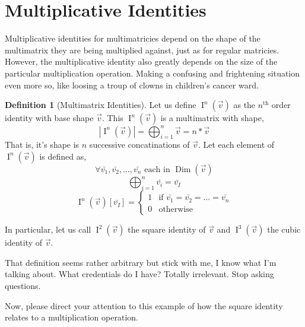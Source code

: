 \documentclass[12pt]{book}
\theoremstyle{plain}
\theoremstyle{definition}
\newtheorem{definition}{Definition}[chapter]
\theoremstyle{ppart}
\theoremstyle{case}
\theoremstyle{solution}
\DeclareMathOperator{\Dim}{Dim}
\DeclareMathOperator{\Ident}{I}
\newcommand{\shape}[1]{\left|#1\right|}
\begin{document}
\section{Multiplicative Identities}

Multiplicative identities for multimatricies depend on the shape of the
multimatrix they are being multiplied against, just as for regular matricies.
However, the multiplicative identity also greatly depends on the size of
the particular multiplication operation. Making a confusing and frightening
situation even more so, like loosing a troup of clowns in children's cancer ward.

\begin{definition}[Multimatrix Identities]
\label{mm_mult_ident}
Let us define $\Ident^n(\vec{v})$ as the $n^{\text{th}}$ order identity with base shape
$\vec{v}$. This $\Ident^n(\vec{v})$ is a multimatrix with shape,
\[ \shape{\Ident^n(\vec{v})} = \bigoplus_{i = 1}^n \vec{v}  = n * \vec{v} \]
That is, it's shape is $n$ successive concatinations of $\vec{v}$.
Let each element of $\Ident^n(\vec{v})$ is defined as,
\[ \forall \bar{v_1}, \bar{v_2}, \ldots, \bar{v_n} \text{ each in } \Dim(\vec{v}) \]
\[ \bigoplus_{i = 1}^n \bar{v_i} = \bar{v_I} \]
\[
 \Ident^n(\vec{v})[\bar{v_I}]
 = \left\{
  \begin{array}{ll}
    1 & \mbox{if } \bar{v_1} = \bar{v_2} = \ldots = \bar{v_n} \\
    0 & \mbox{otherwise}
  \end{array}
 \right.
\]

In particular, let us call $\Ident^2(\vec{v})$ the square identity of $\vec{v}$ and
$\Ident^3(\vec{v})$ the cubic identity of $\vec{v}$.
\end{definition}

That definition seems rather arbitrary but stick with me, I know what I'm
talking about. What credentials do I have? Totally irrelevant. Stop asking questions.

Now, please direct your attention to this example of how the square identity relates
to a multiplication operation.
\end{document}
